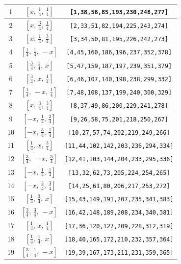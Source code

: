 \documentclass[fleqn,8pt]{jsarticle}
\begin{document}
\begin{longtable}{ccc}
1 & $\left[ x,\, \frac{1}{4},\, \frac{1}{4} \right]$ & {\tt [1,38,56,85,193,230,248,277]} \\ \hline
2 & $\left[ x,\, \frac{3}{4},\, \frac{1}{4} \right]$ & {\tt [2,33,51,82,194,225,243,274]} \\ \hline
3 & $\left[ x,\, \frac{1}{4},\, \frac{3}{4} \right]$ & {\tt [3,34,50,81,195,226,242,273]} \\ \hline
4 & $\left[ \frac{1}{4},\, \frac{1}{4},\, - x \right]$ & {\tt [4,45,160,186,196,237,352,378]} \\ \hline
5 & $\left[ \frac{3}{4},\, \frac{1}{4},\, x \right]$ & {\tt [5,47,159,187,197,239,351,379]} \\ \hline
6 & $\left[ \frac{3}{4},\, x,\, \frac{1}{4} \right]$ & {\tt [6,46,107,140,198,238,299,332]} \\ \hline
7 & $\left[ \frac{1}{4},\, - x,\, \frac{1}{4} \right]$ & {\tt [7,48,108,137,199,240,300,329]} \\ \hline
8 & $\left[ x,\, \frac{3}{4},\, \frac{3}{4} \right]$ & {\tt [8,37,49,86,200,229,241,278]} \\ \hline
9 & $\left[ - x,\, \frac{1}{4},\, \frac{3}{4} \right]$ & {\tt [9,26,58,75,201,218,250,267]} \\ \hline
10 & $\left[ - x,\, \frac{3}{4},\, \frac{1}{4} \right]$ & {\tt [10,27,57,74,202,219,249,266]} \\ \hline
11 & $\left[ \frac{1}{4},\, x,\, \frac{3}{4} \right]$ & {\tt [11,44,102,142,203,236,294,334]} \\ \hline
12 & $\left[ \frac{3}{4},\, - x,\, \frac{3}{4} \right]$ & {\tt [12,41,103,144,204,233,295,336]} \\ \hline
13 & $\left[ - x,\, \frac{1}{4},\, \frac{1}{4} \right]$ & {\tt [13,32,62,73,205,224,254,265]} \\ \hline
14 & $\left[ - x,\, \frac{3}{4},\, \frac{3}{4} \right]$ & {\tt [14,25,61,80,206,217,253,272]} \\ \hline
15 & $\left[ \frac{1}{4},\, \frac{3}{4},\, x \right]$ & {\tt [15,43,149,191,207,235,341,383]} \\ \hline
16 & $\left[ \frac{3}{4},\, \frac{3}{4},\, - x \right]$ & {\tt [16,42,148,189,208,234,340,381]} \\ \hline
17 & $\left[ \frac{1}{4},\, x,\, \frac{1}{4} \right]$ & {\tt [17,36,120,127,209,228,312,319]} \\ \hline
18 & $\left[ \frac{1}{4},\, \frac{1}{4},\, x \right]$ & {\tt [18,40,165,172,210,232,357,364]} \\ \hline
19 & $\left[ \frac{3}{4},\, \frac{1}{4},\, - x \right]$ & {\tt [19,39,167,173,211,231,359,365]} \\ \hline

\end{longtable}
\end{document}

